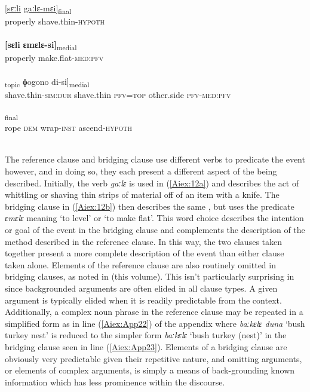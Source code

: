 \documentclass[output=paper]{LSP/langsci}
\begin{document}
\begin{exe}
\ex \label{Aiex:12ad}
\begin{xlist}
\ex \label{Aiex:12a}
\gll \underline{[sɛːli}	\underline{gaːlɛ-mɛi]}\textsubscript{final}\\
properly	shave.thin-\textsc{hypoth}\\
\glt {}\\
\ex \label{Aiex:12b}
\gll \textbf{[sɛli}	\textbf{ɛmɛlɛ-si]}\textsubscript{medial}\\
properly	make.flat-\textsc{med}:\textsc{pfv}\\
\glt {}\\
\ex \label{Aiex:12c}
\gll [[gaːjɛ-liːː	gaːlɛ	di=jaː]\textsubscript{topic}	ɸogono	di-si]\textsubscript{medial}\\
shave.thin-\textsc{sim}:\textsc{dur}	shave.thin	\textsc{pfv}=\textsc{top}	other.side	\textsc{pfv}-\textsc{med}:\textsc{pfv}\\
\glt {}\\
\ex \label{Aiex:12d}
\textsubscript{final}\\
rope	\textsc{dem}	wrap-\textsc{inst}	ascend-\textsc{hypoth}\\
\glt	{}\\
\end{xlist}
\end{exe}

The reference clause and bridging clause use different verbs to predicate the event however, and in doing so, they each present a different aspect of the  being described. Initially, the verb  \textit{gaːlɛ} is used in (\ref{Aiex:12a}) and describes the act of whittling or shaving thin strips of material off of an item with a knife. The bridging clause in (\ref{Aiex:12b}) then describes the same , but uses the predicate \textit{ɛmɛlɛ} meaning `to level' or `to make flat'. This word choice describes the intention or goal of the event in the bridging clause and complements the description of the method described in the reference clause. In this way, the two clauses taken together present a more complete description of the event than either clause taken alone.
	Elements of the reference clause are also routinely omitted in bridging clauses, as noted in \citeauthor{guerin18} (this volume). This isn’t particularly surprising in  since backgrounded arguments are often elided in all  clause types. A given argument is typically elided when it is readily predictable from the context. Additionally, a complex noun phrase in the reference clause may be repeated in a simplified form as in line (\ref{Aiex:App22}) of the appendix where \textit{baːkɛlɛ duna} `bush turkey nest' is reduced to the simpler form \textit{baːkɛlɛ} `bush turkey (nest)' in the bridging clause seen in line (\ref{Aiex:App23}). Elements of a bridging clause are obviously very predictable given their repetitive nature, and omitting arguments, or elements of complex arguments, is simply a means of back-grounding known information which has less prominence within the discourse.
\end{document}
